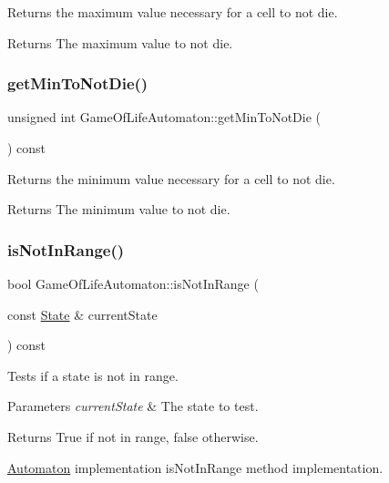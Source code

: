 Returns the maximum value necessary for a cell to not die.

\begin{DoxyReturn}{Returns}
The maximum value to not die. 
\end{DoxyReturn}
\mbox{\label{class_game_of_life_automaton_a5b39939cf80b47d3b0c5a0c16dc07c2e}} 
\subsubsection{\texorpdfstring{get\+Min\+To\+Not\+Die()}{getMinToNotDie()}}
{\footnotesize\ttfamily unsigned int Game\+Of\+Life\+Automaton\+::get\+Min\+To\+Not\+Die (\begin{DoxyParamCaption}{ }\end{DoxyParamCaption}) const\hspace{0.3cm}{\ttfamily [inline]}}

Returns the minimum value necessary for a cell to not die.

\begin{DoxyReturn}{Returns}
The minimum value to not die. 
\end{DoxyReturn}
\mbox{\label{class_game_of_life_automaton_aa25460a77972a5f13f57bb5f5adece53}} 
\subsubsection{\texorpdfstring{is\+Not\+In\+Range()}{isNotInRange()}}
{\footnotesize\ttfamily bool Game\+Of\+Life\+Automaton\+::is\+Not\+In\+Range (\begin{DoxyParamCaption}\item[{const \mbox{\hyperlink{class_state}{State}} \&}]{current\+State }\end{DoxyParamCaption}) const}

Tests if a state is not in range.


\begin{DoxyParams}{Parameters}
{\em current\+State} & The state to test. \\
\hline
\end{DoxyParams}
\begin{DoxyReturn}{Returns}
True if not in range, false otherwise.
\end{DoxyReturn}
\mbox{\hyperlink{class_automaton}{Automaton}} implementation is\+Not\+In\+Range method implementation. \mbox{\label{class_game_of_life_automaton_a090e7935a13cb6f71a0331fff7cb6083}} 
